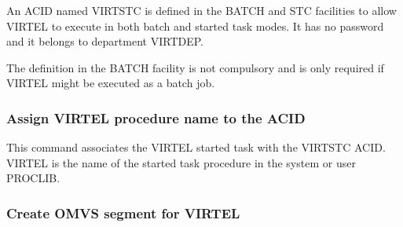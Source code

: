 \documentclass[letterpaper,10pt,english]{sphinxmanual}
\begin{document}
\sphinxAtStartPar
{}

\sphinxAtStartPar
An ACID named VIRTSTC is defined in the BATCH and STC facilities to allow VIRTEL to execute in both batch and started task modes. It has no password and it belongs to department VIRTDEP.

\sphinxAtStartPar
The definition in the BATCH facility is not compulsory and is only required if VIRTEL might be executed as a batch job.


\subsubsection{Assign VIRTEL procedure name to the ACID}
\label{\detokenize{Installation_Guide:assign-virtel-procedure-name-to-the-acid}}
\begin{sphinxVerbatim}[commandchars=\\\{\}]
   
\end{sphinxVerbatim}

\sphinxAtStartPar
{}

\sphinxAtStartPar
This command associates the VIRTEL started task with the VIRTSTC ACID. VIRTEL is the name of the started task procedure in the system or user PROCLIB.


\subsubsection{Create OMVS segment for VIRTEL}
\label{\detokenize{Installation_Guide:id11}}
\begin{sphinxVerbatim}[commandchars=\\\{\}]
     
         
\end{sphinxVerbatim}

\sphinxAtStartPar
{}
\end{document}
